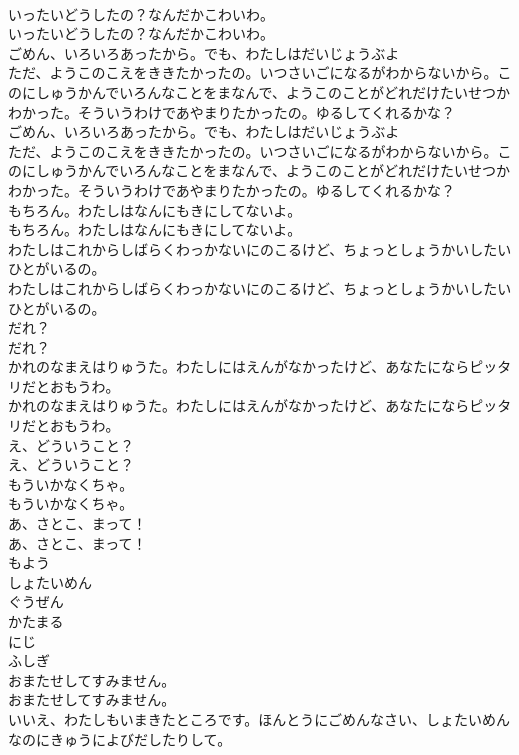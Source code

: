 \documentclass[8pt]{extreport}
\begin{document}
\begin{CJK}{UTF8}{min}
\\	いったいどうしたの？なんだかこわいわ。	
\\	いったいどうしたの？なんだかこわいわ。 
\\	ごめん、いろいろあったから。でも、わたしはだいじょうぶよ
\\	ただ、ようこのこえをききたかったの。いつさいごになるがわからないから。このにしゅうかんでいろんなことをまなんで、ようこのことがどれだけたいせつかわかった。そういうわけであやまりたかったの。ゆるしてくれるかな？	
\\	ごめん、いろいろあったから。でも、わたしはだいじょうぶよ
\\	ただ、ようこのこえをききたかったの。いつさいごになるがわからないから。このにしゅうかんでいろんなことをまなんで、ようこのことがどれだけたいせつかわかった。そういうわけであやまりたかったの。ゆるしてくれるかな？ 
\\	もちろん。わたしはなんにもきにしてないよ。	
\\	もちろん。わたしはなんにもきにしてないよ。 
\\	わたしはこれからしばらくわっかないにのこるけど、ちょっとしょうかいしたいひとがいるの。	
\\	わたしはこれからしばらくわっかないにのこるけど、ちょっとしょうかいしたいひとがいるの。 
\\	だれ？	
\\	だれ？ 
\\	かれのなまえはりゅうた。わたしにはえんがなかったけど、あなたにならピッタリだとおもうわ。	
\\	かれのなまえはりゅうた。わたしにはえんがなかったけど、あなたにならピッタリだとおもうわ。 
\\	え、どういうこと？	
\\	え、どういうこと？ 
\\	もういかなくちゃ。	
\\	もういかなくちゃ。 
\\	あ、さとこ、まって！	
\\	あ、さとこ、まって！ 
\\	もよう
\\	しょたいめん
\\	ぐうぜん
\\	かたまる
\\	にじ
\\	ふしぎ
\\	おまたせしてすみません。	
\\	おまたせしてすみません。 
\\	いいえ、わたしもいまきたところです。ほんとうにごめんなさい、しょたいめんなのにきゅうによびだしたりして。	

\end{CJK}
\end{document}
